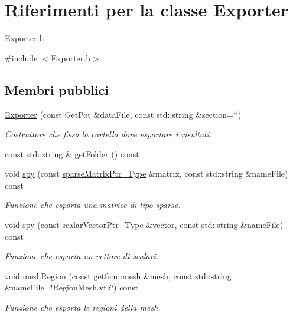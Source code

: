 \hypertarget{classExporter}{\section{Riferimenti per la classe Exporter}
\label{classExporter}
}


\hyperlink{Exporter_8h}{Exporter.\-h}.  




{\ttfamily \#include $<$Exporter.\-h$>$}

\subsection*{Membri pubblici}
\begin{DoxyCompactItemize}
\item 
\hyperlink{classExporter_a14a838ecbf8b9f5a370013430236081f}{Exporter} (const Get\-Pot \&data\-File, const std\-::string \&section=\char`\"{}\char`\"{})
\begin{DoxyCompactList}\small\item\em Costruttore che fissa la cartella dove esportare i risultati. \end{DoxyCompactList}\item 
const std\-::string \& \hyperlink{classExporter_a2771781a7f08fe8518973a6ba712a391}{get\-Folder} () const 
\item 
void \hyperlink{classExporter_a8ca0bdf8550569260ef4f3e39ab274dc}{spy} (const \hyperlink{Core_8h_a87137a9501b38c724ac80bc955164bb7}{sparse\-Matrix\-Ptr\-\_\-\-Type} \&matrix, const std\-::string \&name\-File) const 
\begin{DoxyCompactList}\small\item\em Funzione che esporta una matrice di tipo sparso. \end{DoxyCompactList}\item 
void \hyperlink{classExporter_ab5452c31e85ecfbbda8623aa20723e68}{spy} (const \hyperlink{Core_8h_ab09b6fa3c23db1b8c60456f8690c44a7}{scalar\-Vector\-Ptr\-\_\-\-Type} \&vector, const std\-::string \&name\-File) const 
\begin{DoxyCompactList}\small\item\em Funzione che esporta un vettore di scalari. \end{DoxyCompactList}\item 
void \hyperlink{classExporter_af02a2344019769ab23d9ac673a7b3709}{mesh\-Region} (const getfem\-::mesh \&mesh, const std\-::string \&name\-File=\char`\"{}Region\-Mesh.\-vtk\char`\"{}) const 
\begin{DoxyCompactList}\small\item\em Funzione che esporta le regioni della mesh. \end{DoxyCompactList}\end{DoxyCompactItemize}


